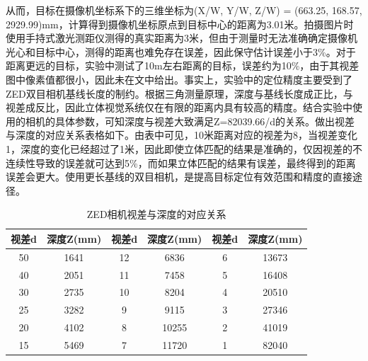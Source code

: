 从而，目标在摄像机坐标系下的三维坐标为(X/W, Y/W, Z/W) = (663.25, 168.57, 2929.99)mm，计算得到摄像机坐标原点到目标中心的距离为3.01米。拍摄图片时使用手持式激光测距仪测得的真实距离为3米，但由于测量时无法准确确定摄像机光心和目标中心，测得的距离也难免存在误差，因此保守估计误差小于3\%。对于距离更远的目标，实验中测试了10m左右距离的目标，误差约为10\%，由于其视差图中像素值都很小，因此未在文中给出。事实上，实验中的定位精度主要受到了ZED双目相机基线长度的制约。根据三角测量原理，深度与基线长度成正比，与视差成反比，因此立体视觉系统仅在有限的距离内具有较高的精度。结合实验中使用的相机的具体参数，可知深度与视差大致满足Z=82039.66/d的关系。做出视差与深度的对应关系表格如下。由表中可见，10米距离对应的视差为8，当视差变化1，深度的变化已经超过了1米，因此即使立体匹配的结果是准确的，仅因视差的不连续性导致的误差就可达到5\%，而如果立体匹配的结果有误差，最终得到的距离误差会更大。使用更长基线的双目相机，是提高目标定位有效范围和精度的直接途径。

\begin{table}[htb] %
	\centering
	\caption{ZED相机视差与深度的对应关系}
	\label{tab:5_ZED相机视差与深度的对应关系}
	\begin{small}
		\begin{tabular}{|cc|cc|cc|}\hline
			视差d & 深度Z(mm) & 视差d & 深度Z(mm) & 视差d & 深度Z(mm) \\\hline
			50      & 1641          & 12      & 6836         & 6        & 13673 \\
			40      & 2051         & 11       & 7458         & 5        & 16408 \\
			30      & 2735         & 10       & 8204        & 4        & 20510 \\
			25      & 3282         & 9        & 9115         & 3        & 27346 \\
			20      & 4102         & 8        & 10255       & 2        & 41019 \\
			15      & 5469         & 7        & 11720        & 1         & 82040 \\
			\hline
		\end{tabular}
	\end{small}
\end{table}



